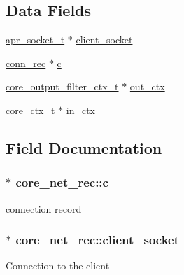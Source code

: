 \subsection*{Data Fields}
\begin{DoxyCompactItemize}
\item 
\hyperlink{structapr__socket__t}{apr\+\_\+socket\+\_\+t} $\ast$ \hyperlink{structcore__net__rec_a046caddb3d9d6fb6c002ffa514e67c1a}{client\+\_\+socket}
\item 
\hyperlink{structconn__rec}{conn\+\_\+rec} $\ast$ \hyperlink{structcore__net__rec_a1818e1223193b0a445029076d851c36c}{c}
\item 
\hyperlink{group__APACHE__CORE__HTTPD_gadbd89ce394d25002077122416b3c889c}{core\+\_\+output\+\_\+filter\+\_\+ctx\+\_\+t} $\ast$ \hyperlink{structcore__net__rec_ae179d22c23e8ff2f19d98a6c00f6c14a}{out\+\_\+ctx}
\item 
\hyperlink{group__APACHE__CORE__HTTPD_ga9d058483cac7066cb341b504b16b6ada}{core\+\_\+ctx\+\_\+t} $\ast$ \hyperlink{structcore__net__rec_aca7cb16759556547ee789fba7609dd33}{in\+\_\+ctx}
\end{DoxyCompactItemize}


\subsection{Field Documentation}
\subsubsection[{\texorpdfstring{c}{c}}]{$\ast$ core\+\_\+net\+\_\+rec\+::c}\hypertarget{structcore__net__rec_a1818e1223193b0a445029076d851c36c}{}\label{structcore__net__rec_a1818e1223193b0a445029076d851c36c}
connection record 
\subsubsection[{\texorpdfstring{client\+\_\+socket}{client_socket}}]{$\ast$ core\+\_\+net\+\_\+rec\+::client\+\_\+socket}\hypertarget{structcore__net__rec_a046caddb3d9d6fb6c002ffa514e67c1a}{}\label{structcore__net__rec_a046caddb3d9d6fb6c002ffa514e67c1a}
Connection to the client 
